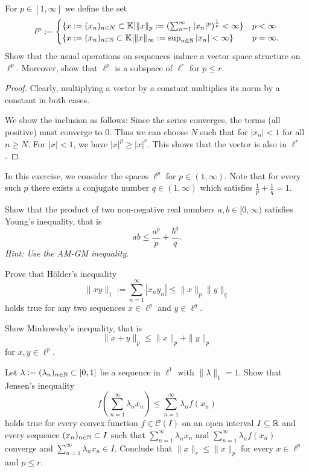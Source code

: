 \begin{Problem}
	For $p\in [1,\infty]$ we define the set
	\[
	\ell^p:=\begin{cases}
		\{x:=(x_n)_{n\in N}\subset \mathbb{K}|\|x\|_p:=(\sum_{n=1}^\infty |x_n|^p)^{\frac{1}{p}}<\infty\} & p<\infty\\
		\{x:=(x_n)_{n\in \mathbb{N}}\subset \mathbb{K}|\|x\|_\infty := \sup_{n\in \mathbb{N}}|x_n|<\infty\} & p=\infty.
	\end{cases}
	\] 
Show that the usual operations on sequences induce a vector space structure on $\ell^p$. Moreover, show that $\ell^p$ is a subspace of $\ell^r$ for $p\le r$.
\end{Problem}
\begin{proof}
	Clearly, multiplying a vector by a constant multiplies its norm by a constant in both cases. 

	We show the inclusion as follows: Since the series converges, the terms (all positive) must converge to $0$. Thus we can choose $N$ such that for $|x_n|<1$ for all $n\ge N$. For $|x|<1$, we have $|x|^p\ge |x|^r$. This shows that the vector is also in $\ell^r$.
\end{proof}
\begin{Problem}
	In this exercise, we consider the spaces $\ell^p$ for $p\in (1,\infty)$. Note that for every such $p$ there exists a conjugate number $q\in (1,\infty)$ which satisfies $\frac{1}{p}+\frac{1}{q}=1$.
	\begin{parts}
	\item Show that the product of two non-negative real numbers $a,b\in [0,\infty)$ satisfies Young's inequality, that is
		\[
		ab\le \frac{a^p}{p}+\frac{b^q}{q}
		.\] 
		\emph{Hint: Use the AM-GM inequality.}
	\item Prove that H\"{o}lder's inequality
		\[
		\|xy\|_1:=\sum_{n=1}^{\infty} |x_ny_n|\le \|x\|_p \|y\|_q
		\]
		holds true for any two sequences $x\in \ell^p$ and $y\in \ell^q$.
	\item Show Minkowsky's inequality, that is
		\[
		\|x+y\|_p\le \|x\|_p + \|y\|_p
		\]
		for $x,y\in \ell^p$.
	\item Let $\lambda:=(\lambda_n)_{n\in \mathbb{N}}\subset [0,1]$ be a sequence in $\ell^1$ with $\|\lambda\|_1=1$. Show that Jensen's inequality
		\[
		f\left( \sum_{n=1}^\infty \lambda_n x_n \right)\le \sum_{n=1}^{\infty} \lambda_n f(x_n)
		\]
		holds true for every convex function $f\in \mathcal{C}(I)$ on an open interval $I\subseteq \mathbb{R}$ and every sequence $(x_n)_{n\in \mathbb{N}}\subset I$ such that $\sum_{n=1}^{\infty} \lambda_n x_n$ and $\sum_{n=1}^{\infty} \lambda_n f(x_n)$ converge and $\sum_{n=1}^{\infty} \lambda_n x_n\in I$. Conclude that $\|x\|_r\le \|x\|_p$ for every $x\in \ell^p$ and $p\le r$.
	\end{parts}
\end{Problem}

